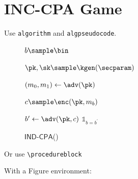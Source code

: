 





\maketitle

\section{INC-CPA Game}

Use \texttt{algorithm} and \texttt{algpseudocode}.
\begin{figure}[h]
\centering

    \begin{minipage}{0.4\linewidth}
    \centering
    \begin{algorithm}[H]
    \caption{$\mathsf{IND\text{-}CPA}$(\adv)}
    \label{alg:ind-cpa}
    \begin{algorithmic}[1]
		\State $b \sample \bin$

        \State $\pk, \sk \sample \kgen(\secparam)$
        
        \State $(m_0, m_1) \gets \adv(\pk)$

        \State $c \sample \enc(\pk, m_b)$

        \State $b^\prime \gets \adv(\pk, c)$
        \State \Return $\mathds{1}_{b = b^\prime}$
    \end{algorithmic}
    \end{algorithm}
    \end{minipage}

\end{figure}

Or use \texttt{\textbackslash procedureblock}


With a Figure environment:

